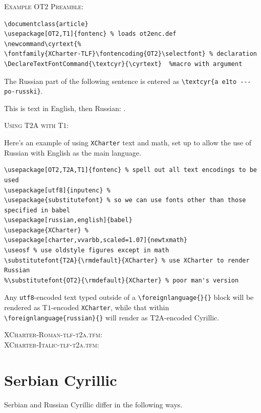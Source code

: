 \documentclass[11pt]{article}
\newcommand\cyrtext{\fontfamily{XCharter-TLF}\fontencoding{OT2}\selectfont} %
\begin{document}
\textsc{Example OT$2$ Preamble:}

\begin{verbatim}
\documentclass{article} 
\usepackage[OT2,T1]{fontenc} % loads ot2enc.def
\newcommand\cyrtext{%
\fontfamily{XCharter-TLF}\fontencoding{OT2}\selectfont} % declaration
\DeclareTextFontCommand{\textcyr}{\cyrtext}  %macro with argument
\end{verbatim}
The Russian part of the following sentence is entered as \verb|\textcyr{a e1to --- po-russki}|.

This is text in English, then Russian:
.
\newpage

\textsc{Using T$2$A with T$1$:}

Here's an example of using {\tt XCharter} text and math, set up to allow the use of  Russian with English as the main language.
\begin{verbatim}
\usepackage[OT2,T2A,T1]{fontenc} % spell out all text encodings to be used
\usepackage[utf8]{inputenc} % 
\usepackage{substitutefont} % so we can use fonts other than those specified in babel
\usepackage[russian,english]{babel}
\usepackage{XCharter} % 
\usepackage[charter,vvarbb,scaled=1.07]{newtxmath}
\useosf % use oldstyle figures except in math
\substitutefont{T2A}{\rmdefault}{XCharter} % use XCharter to render Russian 
%\substitutefont{OT2}{\rmdefault}{XCharter} % poor man's version
\end{verbatim}
Any {\tt utf8}-encoded text typed outside of a \verb|\foreignlanguage{}{}| block will be rendered as T$1$-encoded {\tt XCharter}, while that within \verb|\foreignlanguage{russian}{}| will render as T$2$A-encoded Cyrillic. 

\newpage
\textsc{XCharter-Roman-tlf-t2a.tfm}:\\
\newpage
\textsc{XCharter-Italic-tlf-t2a.tfm}:\\

\section{Serbian Cyrillic}
Serbian and Russian Cyrillic differ in the following ways.
\end{document}

